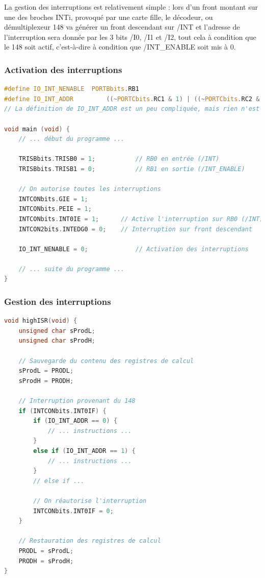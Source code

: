 \documentclass[a4paper]{article}
\begin{document}
La gestion des interruptions est relativement simple : lors d'un front montant sur une des broches INTi, provoqué par une carte fille, le décodeur, ou démultiplexeur 148 \cite{74HC148} va générer un front descendant sur /INT et l'adresse de l'interruption sera donnée par les 3 bits /I0, /I1 et /I2, tout cela à condition que le 148 soit actif, c'est-à-dire à condition que /INT\_ENABLE soit mis à 0.

\subsubsection{Activation des interruptions}

\begin{lstlisting}[caption=Activation des interruptions pour le PIC18F452, label=Activation_des_interruptions_pour_le_PIC18F452, language=c]
#define IO_INT_NENABLE	PORTBbits.RB1
#define IO_INT_ADDR			((~PORTCbits.RC1 & 1) | ((~PORTCbits.RC2 & 1) << 1) | ((~PORTCbits.RC3 & 1) << 2))
// La définition de IO_INT_ADDR est un peu compliquée, mais rien n'est superflu, sinon ça ne marche pas...

void main (void) {
	// ... début du programme ...

	TRISBbits.TRISB0 = 1;			// RB0 en entrée (/INT)
	TRISBbits.TRISB1 = 0;			// RB1 en sortie (/INT_ENABLE)

	// On autorise toutes les interruptions
	INTCONbits.GIE = 1;
	INTCONbits.PEIE = 1;
	INTCONbits.INT0IE = 1;		// Active l'interruption sur RB0 (/INT)
	INTCON2bits.INTEDG0 = 0;	// Interruption sur front descendant

	IO_INT_NENABLE = 0;				// Activation des interruptions

	// ... suite du programme ...
}
\end{lstlisting}

\subsubsection{Gestion des interruptions}

\begin{lstlisting}[caption=Gestion des interruptions pour le PIC18F452, label=Gestion_des_interruptions_pour_le_PIC18F452, language=c]
void highISR(void) {
	unsigned char sProdL;
	unsigned char sProdH;

	// Sauvegarde du contenu des registres de calcul
	sProdL = PRODL;
	sProdH = PRODH;

	// Interruption provenant du 148
	if (INTCONbits.INT0IF) {
		if (IO_INT_ADDR == 0) {
			// ... instructions ...
		}
		else if (IO_INT_ADDR == 1) {
			// ... instructions ...
		}
		// else if ...

		// On réautorise l'interruption
		INTCONbits.INT0IF = 0;
	}

	// Restauration des registres de calcul
	PRODL = sProdL;
	PRODH = sProdH;
}
\end{lstlisting}
\end{document}
